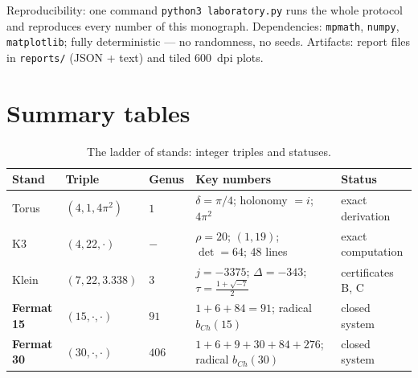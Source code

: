 Reproducibility: one command \texttt{python3 laboratory.py} runs the
whole protocol and reproduces every number of this monograph.
Dependencies: \texttt{mpmath}, \texttt{numpy}, \texttt{matplotlib};
fully deterministic --- no randomness, no seeds. Artifacts: report
files in \texttt{reports/} (JSON + text) and tiled $600$~dpi plots.

\section{Summary tables}\label{sec:summary}

\begin{table}[t]
\centering
\caption{The ladder of stands: integer triples and statuses.}
\label{tab:ladder-full}
\small
\begin{tabularx}{\textwidth}{@{}l l l l >{\raggedright\arraybackslash}X@{}}
\toprule
Stand & Triple & Genus & Key numbers & Status \\
\midrule
Torus & $(4,1,4\pi^2)$ & $1$ & $\delta=\pi/4$; holonomy $=i$;
  $4\pi^2$ & exact derivation \\
K3 & $(4,22,\cdot)$ & $-$ & $\rho=20$; $(1,19)$; $\det=64$;
  $48$ lines & exact computation \\
Klein & $(7,22,3.338)$ & $3$ & $j=-3375$; $\Delta=-343$;
  $\tau=\tfrac{1+\sqrt{-7}}2$ & certificates B, C \\
\textbf{Fermat 15} & $(15,\cdot,\cdot)$ & $91$ &
  $1+6+84=91$; radical $b_{Ch}(15)$ & closed system \\
\textbf{Fermat 30} & $(30,\cdot,\cdot)$ & $406$ &
  $1+6+9+30+84+276$; radical $b_{Ch}(30)$ & closed system \\
\bottomrule
\end{tabularx}
\end{table}

